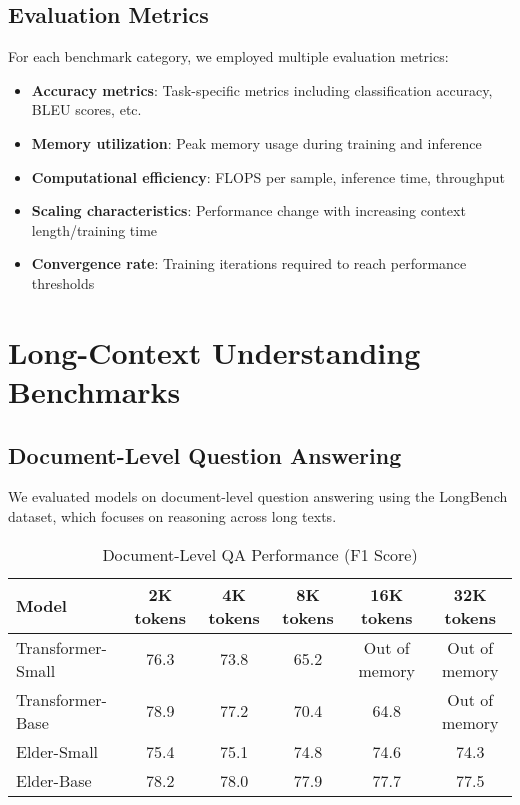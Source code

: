 \subsection{Evaluation Metrics}

For each benchmark category, we employed multiple evaluation metrics:

\begin{itemize}
    \item \textbf{Accuracy metrics}: Task-specific metrics including classification accuracy, BLEU scores, etc.
    \item \textbf{Memory utilization}: Peak memory usage during training and inference
    \item \textbf{Computational efficiency}: FLOPS per sample, inference time, throughput
    \item \textbf{Scaling characteristics}: Performance change with increasing context length/training time
    \item \textbf{Convergence rate}: Training iterations required to reach performance thresholds
\end{itemize}

\section{Long-Context Understanding Benchmarks}

\subsection{Document-Level Question Answering}

We evaluated models on document-level question answering using the LongBench dataset, which focuses on reasoning across long texts.

\begin{table}[h]
\centering
\caption{Document-Level QA Performance (F1 Score)}
\label{tab:document_qa}
\begin{tabular}{|l|c|c|c|c|c|}
\hline
\textbf{Model} & \textbf{2K tokens} & \textbf{4K tokens} & \textbf{8K tokens} & \textbf{16K tokens} & \textbf{32K tokens} \\
\hline
Transformer-Small & 76.3 & 73.8 & 65.2 & Out of memory & Out of memory \\
Transformer-Base & 78.9 & 77.2 & 70.4 & 64.8 & Out of memory \\
Elder-Small & 75.4 & 75.1 & 74.8 & 74.6 & 74.3 \\
Elder-Base & 78.2 & 78.0 & 77.9 & 77.7 & 77.5 \\
\hline
\end{tabular}
\end{table}

